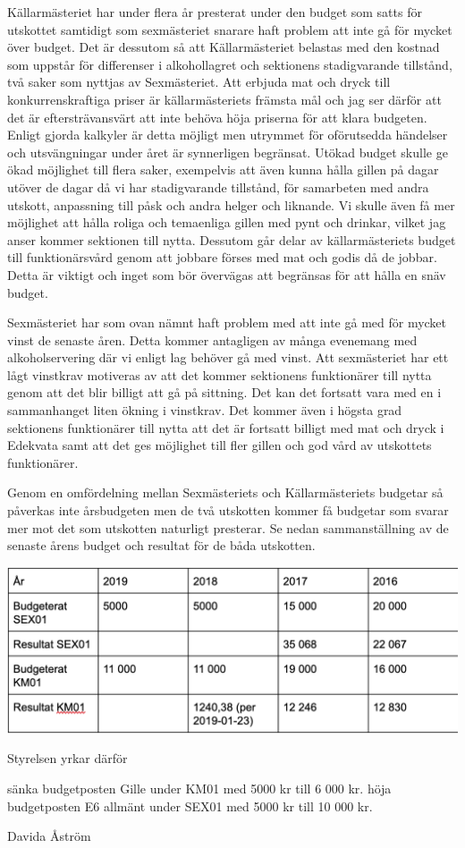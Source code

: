 \documentclass[../_main/handlingar.tex]{subfiles}
\begin{document}

    Källarmästeriet har under flera år presterat under den budget som satts för utskottet samtidigt som sexmästeriet snarare haft problem att inte gå för mycket över budget. Det är dessutom så att Källarmästeriet belastas med den kostnad som uppstår för differenser i alkohollagret och sektionens stadigvarande tillstånd, två saker som nyttjas av Sexmästeriet. Att erbjuda mat och dryck till konkurrenskraftiga priser är källarmästeriets främsta mål och jag ser därför att det är eftersträvansvärt att inte behöva höja priserna för att klara budgeten. Enligt gjorda kalkyler är detta möjligt men utrymmet för oförutsedda händelser och utsvängningar under året är synnerligen begränsat. Utökad budget skulle ge ökad möjlighet till flera saker, exempelvis att även kunna hålla gillen på dagar utöver de dagar då vi har stadigvarande tillstånd, för samarbeten med andra utskott, anpassning till påsk och andra helger och liknande. Vi skulle även få mer möjlighet att hålla roliga och temaenliga gillen med pynt och drinkar, vilket jag anser kommer sektionen till nytta. Dessutom går delar av källarmästeriets budget till funktionärsvård genom att jobbare förses med mat och godis då de jobbar. Detta är viktigt och inget som bör övervägas att begränsas för att hålla en snäv budget. 

Sexmästeriet har som ovan nämnt haft problem med att inte gå med för mycket vinst de senaste åren. Detta kommer antagligen av många evenemang med alkoholservering där vi enligt lag behöver gå med vinst. Att sexmästeriet har ett lågt vinstkrav motiveras av att det kommer sektionens funktionärer till nytta genom att det blir billigt att gå på sittning. Det kan det fortsatt vara med en i sammanhanget liten ökning i vinstkrav. Det kommer även i högsta grad sektionens funktionärer till nytta att det är fortsatt billigt med mat och dryck i Edekvata samt att det ges möjlighet till fler gillen och god vård av utskottets funktionärer.  

Genom en omfördelning mellan Sexmästeriets och Källarmästeriets budgetar så påverkas inte årsbudgeten men de två utskotten kommer få budgetar som svarar mer mot det som utskotten naturligt presterar. Se nedan sammanställning av de senaste årens budget och resultat för de båda utskotten.


    \begin{center}
        \includegraphics[scale=0.5]{../_res/budget_resultat.jpg}
    \end{center}


Styrelsen yrkar därför 
\begin{attsatser}
    \att sänka budgetposten Gille under KM01 med 5000 kr till 6 000 kr.
    \att höja budgetposten E6 allmänt under SEX01 med 5000 kr till 10 000 kr. 
\end{attsatser}

\begin{signatures}{1}
    \ist
    \signature{\krog}{Davida Åström}
\end{signatures}
\end{document}
